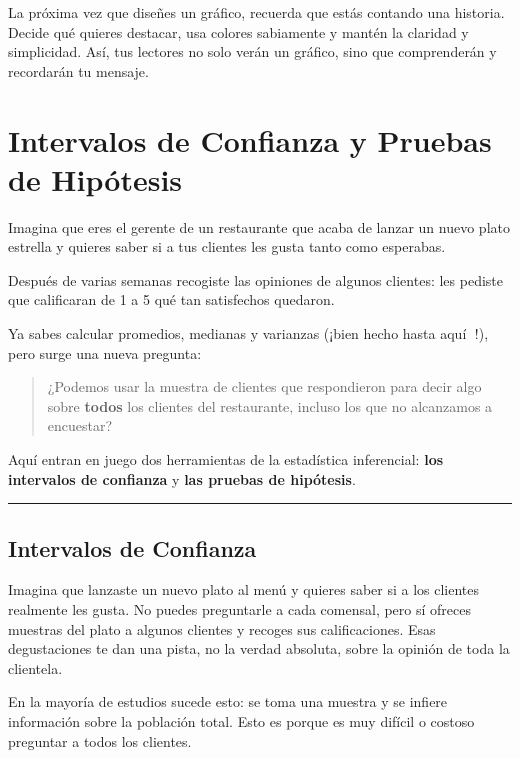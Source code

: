 \documentclass[
  spanish,
  letterpaper,
  DIV=11,
  numbers=noendperiod]{scrreprt}
\begin{document}
La próxima vez que diseñes un gráfico, recuerda que estás contando una
historia. Decide qué quieres destacar, usa colores sabiamente y mantén
la claridad y simplicidad. Así, tus lectores no solo verán un gráfico,
sino que comprenderán y recordarán tu mensaje.


\chapter{Intervalos de Confianza y Pruebas de
Hipótesis}\label{intervalos-de-confianza-y-pruebas-de-hipuxf3tesis}

Imagina que eres el gerente de un restaurante que acaba de lanzar un
nuevo plato estrella y quieres saber si a tus clientes les gusta tanto
como esperabas.

Después de varias semanas recogiste las opiniones de algunos clientes:
les pediste que calificaran de 1 a 5 qué tan satisfechos quedaron.

Ya sabes calcular promedios, medianas y varianzas (¡bien hecho hasta
aquí 🎉!), pero surge una nueva pregunta:

\begin{quote}
¿Podemos usar la muestra de clientes que respondieron para decir algo
sobre \textbf{todos} los clientes del restaurante, incluso los que no
alcanzamos a encuestar?
\end{quote}

Aquí entran en juego dos herramientas de la estadística inferencial:
\textbf{los intervalos de confianza} y \textbf{las pruebas de
hipótesis}.

\begin{center}\rule{0.5\linewidth}{0.5pt}\end{center}

\section{Intervalos de Confianza}\label{intervalos-de-confianza}

Imagina que lanzaste un nuevo plato al menú y quieres saber si a los
clientes realmente les gusta. No puedes preguntarle a cada comensal,
pero sí ofreces muestras del plato a algunos clientes y recoges sus
calificaciones. Esas degustaciones te dan una pista, no la verdad
absoluta, sobre la opinión de toda la clientela.

En la mayoría de estudios sucede esto: se toma una muestra y se infiere
información sobre la población total. Esto es porque es muy difícil o
costoso preguntar a todos los clientes.
\end{document}
